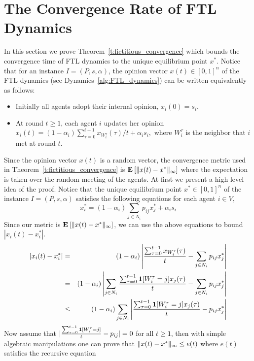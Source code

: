 \section{The Convergence Rate of FTL Dynamics}\label{s:fictitious_convergence}
In this section we prove Theorem~\ref{t:fictitious_convergence} which bounds
the convergence time of FTL dynamics to the unique equilibrium point $x^*$.
Notice that for an instance $I=(P,s,\alpha)$, the opinion vector $x(t) \in [0,1]^n$
of the FTL dynamics (see Dynamics~\ref{alg:FTL_dynamics}) can be written
equivalently as follows:
\begin{itemize}
 \item Initially all agents adopt their internal opinion, $x_i(0)=s_i$.
 \item At round $t \geq 1$, each agent $i$ updates her opinion
 \(
x_i(t)=(1-\alpha_i)\sum_{\tau=0}^{t-1} x_{W_i^\tau}(\tau)/t+ \alpha_i s_i,
\)
where $W_i^\tau$ is the neighbor that $i$ met at round $t$.
\end{itemize}
Since the opinion vector $x(t)$ is a random vector,
the convergence metric used in Theorem~\ref{t:fictitious_convergence} is
$\bm{\mathrm{E}}_{} \left[ \| x(t) - x^* \|_{\infty} \right]$ where the expectation is taken
over the random meeting of the agents.
%
%
At first we present a high level idea of the proof.
Notice that the unique equilibrium point $x^* \in [0,1]^n$ of the
instance $I=(P,s,\alpha)$ satisfies the following equations
for each agent $i \in V$,
\[x_i^*= (1-\alpha_i)\sum_{j \in N_i}p_{ij}x_j^* + \alpha_is_i\]
Since our metric is $\bm{\mathrm{E}}_{} \left[ \| x(t)-x^* \|_{\infty} \right]$, we
can use the above equations to bound $|x_i(t)-x_i^*|$.
\begin{eqnarray*}
 |x_i(t)-x_i^*|
 &=& (1-\alpha_i)\left|\frac{\sum_{\tau=0}^{t-1} x_{W_i^\tau}(\tau)}{t}
 - \sum_{j \in N_i} p_{ij}x_j^*\right|\\
 &=& (1-\alpha_i)\left|\sum_{j \in N_i}\frac{\sum_{\tau=0}^{t-1} \bm{1}{\left[W_i^\tau=j\right]}x_j(\tau)}{t}-\sum_{j \in N_i} p_{ij}x_j^*\right|\\
 &\leq& (1-\alpha_i)\sum_{j \in N_i}\left|\frac{\sum_{\tau=0}^{t-1} \bm{1}{\left[W_i^\tau=j\right]}x_j(\tau)}{t}- p_{ij}x_j^*\right|
\end{eqnarray*}
Now assume that $|\frac{\sum_{\tau=0}^{t-1} \bm{1}{\left[W_i^{\tau}=j\right]}}{t}- p_{ij}| = 0$
for all $t\geq 1$, then with simple algebraic manipulations
one can prove that $\| x(t)-x^* \|_{\infty} \leq e(t)$ where $e(t)$
satisfies the recursive equation
